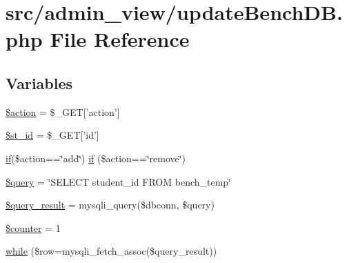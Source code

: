 \hypertarget{updateBenchDB_8php}{\section{src/admin\-\_\-view/update\-Bench\-D\-B.php \-File \-Reference}
\label{updateBenchDB_8php}
}
\subsection*{\-Variables}
\begin{DoxyCompactItemize}
\item 
\hyperlink{updateBenchDB_8php_aa698a3e72116e8e778be0e95d908ee30}{\$action} = \$\-\_\-\-G\-E\-T\mbox{[}'action'\mbox{]}
\item 
\hyperlink{updateBenchDB_8php_ab68b86e23fd74e101c03130a49b24f66}{\$st\-\_\-id} = \$\-\_\-\-G\-E\-T\mbox{[}'id'\mbox{]}
\item 
\hyperlink{updateBenchDB_8php_a0c1f2915e12defa9f4d515347d884dee}{if}(\$action==\char`\"{}add\char`\"{}) \hyperlink{updateBenchDB_8php_a0c1f2915e12defa9f4d515347d884dee}{if} (\$action==\char`\"{}remove\char`\"{})
\item 
\hyperlink{updateBenchDB_8php_af59a5f7cd609e592c41dc3643efd3c98}{\$query} = \char`\"{}\-S\-E\-L\-E\-C\-T student\-\_\-id \-F\-R\-O\-M bench\-\_\-temp\char`\"{}
\item 
\hyperlink{updateBenchDB_8php_ade0b3dacf5d65d8f2293ffa78561fe31}{\$query\-\_\-result} = mysqli\-\_\-query(\$dbconn, \$query)
\item 
\hyperlink{updateBenchDB_8php_adc0a189fac719187ba2e6f01ca0f2466}{\$counter} = 1
\item 
\hyperlink{updateBenchDB_8php_abbca5b4e0da1a7b7e95bb777ad93473d}{while} (\$row=mysqli\-\_\-fetch\-\_\-assoc(\$query\-\_\-result))
\end{DoxyCompactItemize}



